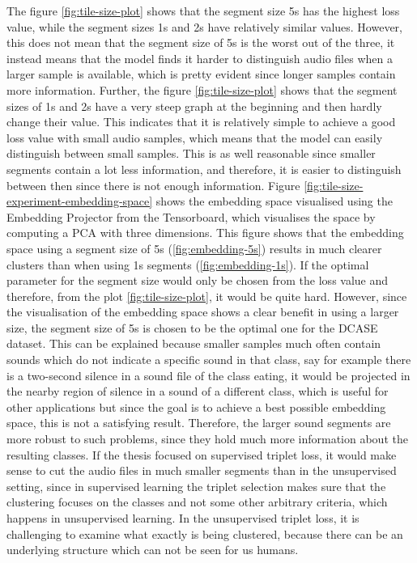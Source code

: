 The figure \ref{fig:tile-size-plot} shows that the segment size 5s has the highest loss value, while the segment sizes 1s and 2s have relatively similar values. However, this does not mean that the segment size of 5s is the worst out of the three, it instead means that the model finds it harder to distinguish audio files when a larger sample is available, which is pretty evident since longer samples contain more information. Further, the figure \ref{fig:tile-size-plot} shows that the segment sizes of 1s and 2s have a very steep graph at the beginning and then hardly change their value. This indicates that it is relatively simple to achieve a good loss value with small audio samples, which means that the model can easily distinguish between small samples. This is as well reasonable since smaller segments contain a lot less information, and therefore, it is easier to distinguish between then since there is not enough information. Figure \ref{fig:tile-size-experiment-embedding-space} shows the embedding space visualised using the Embedding Projector from the Tensorboard, which visualises the space by computing a \gls{PCA} with three dimensions. This figure shows that the embedding space using a segment size of 5s (\ref{fig:embedding-5s}) results in much clearer clusters than when using 1s segments (\ref{fig:embedding-1s}). 
\newline
\newline
If the optimal parameter for the segment size would only be chosen from the loss value and therefore, from the plot \ref{fig:tile-size-plot}, it would be quite hard. However, since the visualisation of the embedding space shows a clear benefit in using a larger size, the segment size of 5s is chosen to be the optimal one for the \gls{DCASE} dataset. This can be explained because smaller samples much often contain sounds which do not indicate a specific sound in that class, say for example there is a two-second silence in a sound file of the class eating, it would be projected in the nearby region of silence in a sound of a different class, which is useful for other applications but since the goal is to achieve a best possible embedding space, this is not a satisfying result. Therefore, the larger sound segments are more robust to such problems, since they hold much more information about the resulting classes. 
\newline
\newline
If the thesis focused on supervised triplet loss, it would make sense to cut the audio files in much smaller segments than in the unsupervised setting, since in supervised learning the triplet selection makes sure that the clustering focuses on the classes and not some other arbitrary criteria, which happens in unsupervised learning. In the unsupervised triplet loss, it is challenging to examine what exactly is being clustered, because there can be an underlying structure which can not be seen for us humans.
